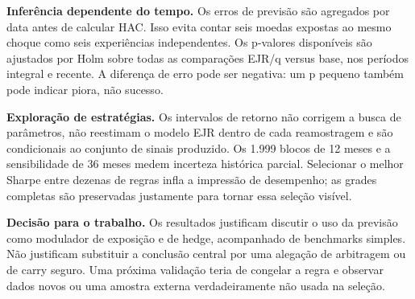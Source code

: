 \documentclass[11pt,a4paper]{article}
\begin{document}
\textbf{Inferência dependente do tempo.} Os erros de previsão são agregados por data antes de calcular HAC. Isso evita contar seis moedas expostas ao mesmo choque como seis experiências independentes. Os p-valores disponíveis são ajustados por Holm sobre todas as comparações EJR/q versus base, nos períodos integral e recente. A diferença de erro pode ser negativa: um p pequeno também pode indicar piora, não sucesso.

\textbf{Exploração de estratégias.} Os intervalos de retorno não corrigem a busca de parâmetros, não reestimam o modelo EJR dentro de cada reamostragem e são condicionais ao conjunto de sinais produzido. Os 1.999 blocos de 12 meses e a sensibilidade de 36 meses medem incerteza histórica parcial. Selecionar o melhor Sharpe entre dezenas de regras infla a impressão de desempenho; as grades completas são preservadas justamente para tornar essa seleção visível.

\textbf{Decisão para o trabalho.} Os resultados justificam discutir o uso da previsão como modulador de exposição e de hedge, acompanhado de benchmarks simples. Não justificam substituir a conclusão central por uma alegação de arbitragem ou de carry seguro. Uma próxima validação teria de congelar a regra e observar dados novos ou uma amostra externa verdadeiramente não usada na seleção.

\clearpage
\end{document}
